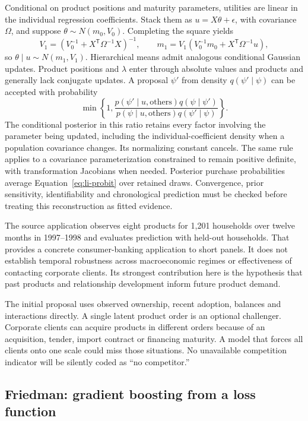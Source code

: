 Conditional on product positions and maturity parameters, utilities are linear in the individual regression coefficients. Stack them as $u=X\theta+\epsilon$, with covariance $\Omega$, and suppose $\theta\sim N(m_0,V_0)$. Completing the square yields
\[
 V_1=(V_0^{-1}+X^{\mathsf T}\Omega^{-1}X)^{-1},\qquad
 m_1=V_1(V_0^{-1}m_0+X^{\mathsf T}\Omega^{-1}u),
\]
so $\theta\mid u\sim N(m_1,V_1)$. Hierarchical means admit analogous conditional Gaussian updates. Product positions and $\lambda$ enter through absolute values and products and generally lack conjugate updates. A proposal $\psi'$ from density $q(\psi'\mid\psi)$ can be accepted with probability
\[
 \min\left\{1,\frac{p(\psi'\mid u,\text{others})q(\psi\mid\psi')}
 {p(\psi\mid u,\text{others})q(\psi'\mid\psi)}\right\}.
\]
The conditional posterior in this ratio retains every factor involving the parameter being updated, including the individual-coefficient density when a population covariance changes. Its normalizing constant cancels. The same rule applies to a covariance parameterization constrained to remain positive definite, with transformation Jacobians when needed. Posterior purchase probabilities average Equation~\eqref{eq:li-probit} over retained draws. Convergence, prior sensitivity, identifiability and chronological prediction must be checked before treating this reconstruction as fitted evidence.

The source application observes eight products for 1,201 households over twelve months in 1997--1998 and evaluates prediction with held-out households. That provides a concrete consumer-banking application to short panels. It does not establish temporal robustness across macroeconomic regimes or effectiveness of contacting corporate clients. Its strongest contribution here is the hypothesis that past products and relationship development inform future product demand.

The initial proposal uses observed ownership, recent adoption, balances and interactions directly. A single latent product order is an optional challenger. Corporate clients can acquire products in different orders because of an acquisition, tender, import contract or financing maturity. A model that forces all clients onto one scale could miss those situations. No unavailable competition indicator will be silently coded as ``no competitor.''

\subsection{Friedman: gradient boosting from a loss function}


